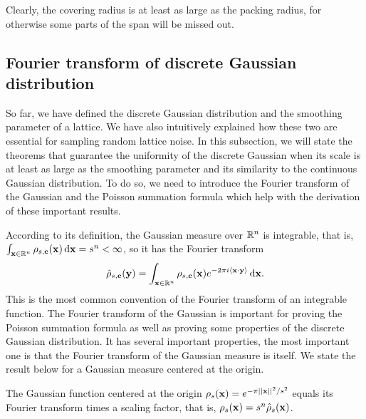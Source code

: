 \documentclass[../main.tex]{subfiles}
\begin{document}
Clearly, the covering radius is at least as large as the packing radius, for otherwise some parts of the span will be missed out. 
\fi 


\subsection{Fourier transform of discrete Gaussian distribution}



So far, we have defined the discrete Gaussian distribution and the smoothing parameter of a lattice. We have also intuitively explained how these two are essential for sampling random lattice noise. In this subsection, we will state the theorems that guarantee the uniformity of the discrete Gaussian when its scale is at least as large as the smoothing parameter and its similarity to the continuous Gaussian distribution. To do so, we need to introduce the Fourier transform of the Gaussian and the Poisson summation formula which help with the derivation of these important results. 

According to its definition, the Gaussian measure over $\mathbb{R}^n$ is integrable, that is, $\int_{\mathbf{x} \in \mathbb{R}^n} \rho_{s,\mathbf{c}}(\mathbf{x}) \mathop{}\!\mathrm{d} \mathbf{x} = s^n < \infty$, so it has the Fourier transform 
\reversemarginpar
{}
\begin{equation}
\label{equ:ftGaussian}
    \hat{\rho}_{s,\mathbf{c}}(\mathbf{y}) = \int_{\mathbf{x} \in \mathbb{R}^n} \rho_{s,\mathbf{c}}(\mathbf{x}) e^{-2\pi i \langle \mathbf{x} \cdot \mathbf{y} \rangle} \mathop{}\!\mathrm{d} \mathbf{x}.
\end{equation}
This is the most common convention of the Fourier transform of an integrable function. The Fourier transform of the Gaussian is important for proving the Poisson summation formula as well as proving some properties of the discrete Gaussian distribution. It has several important properties, the most important one is that the Fourier transform of the Gaussian measure is itself. We state the result below for a Gaussian measure centered at the origin.

\begin{lemma}
The Gaussian function centered at the origin $\rho_{s}(\mathbf{x})=e^{-\pi ||\mathbf{x}||^2/s^2}$ equals its Fourier transform times a scaling factor, that is, $\rho_{s}(\mathbf{x})=s^n \hat{\rho}_{s}(\mathbf{x})$.
\end{lemma}
\end{document}

